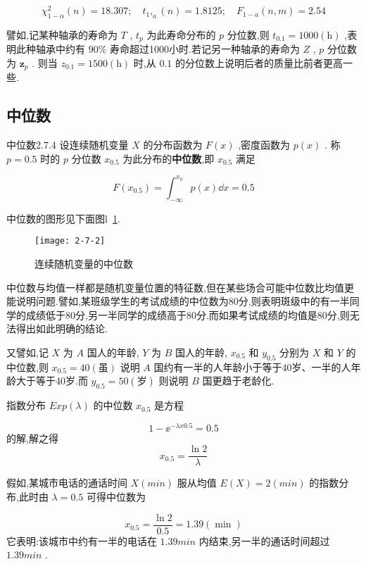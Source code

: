 \[
\chi_{1-\alpha}^{2}(n)=18.307 ; \quad t_{1},_{a}(n)=1.8125 ; \quad F_{1-a}(n, m)=2.54
\]

譬如,记某种轴承的寿命为 $ T $ , $ t_{p} $ 为此寿命分布的 $ p $ 分位数,则 $ t_{0.1}=1000 (\mathrm{h}) $ ,表明此种轴承中约有 $ 90\% $ 寿命超过1000小时.若记另一种轴承的寿命为 $ Z $ , $ p $ 分位数为 $ \boldsymbol{z}_{p} $ . 则当 $ z_{0.1}=1500(\mathrm{h}) $ 时,从 $ 0.1 $ 的分位数上说明后者的质量比前者更高一些.

\subsection{中位数}\label{ssec:2.7.4}

\begin{definition}{中位数}{2.7.4}
	设连续随机变量 $ X $ 的分布函数为 $ F(x) $ ,密度函数为 $ p(x) $ .
	称 $ p=0.5 $ 时的 $ p $ 分位数 $ x_{0.5} $ 为此分布的\textbf{中位数},即 $ x_{0.5} $ 满足
	
	\begin{equation}
	F\left(x_{0.5}\right)=\int_{-\infty}^{x_{0}} p(x) \dd x=0.5 \label{eq:2.7.8}
	\end{equation}
	
\end{definition}

中位数的图形见下面图l~\ref{fig:2.7.2}.

\begin{figure}
	\centering
	\texttt{[image: 2-7-2]}
	\caption{连续随机变量的中位数}
	\label{fig:2.7.2}
\end{figure}

中位数与均值一样都是随机变量位置的特征数,但在某些场合可能中位数比均值更能说明问题.譬如,某班级学生的考试成绩的中位数为80分,则表明斑级中的有一半同学的成绩低于80分,另一半同学的成绩高于80分.而如果考试成绩的均值是80分,则无法得出如此明确的结论.

又譬如,记 $ X $ 为 $ A $ 国人的年龄, $ Y $ 为 $ B $ 国人的年龄, $ x_{0.5} $ 和 $ y_{0.5} $ 分别为 $ X $ 和 $ Y $ 的中位数,则 $ x_{0.5}=40(\text{虽}) $ 说明 $ A $ 国约有一半的人年龄小于等于40岁、一半的人年龄大于等于40岁.而 $ y_{0.5}=50(\text{岁}) $ 则说明 $ B $ 国更趋于老龄化.

\begin{example}\label{exam:2.7.4}
	指数分布 $ E x p(\lambda) $ 的中位数 $ x_{0.5} $ 是方程
	
	\[
	1-\ee ^{-\lambda x 0.5}=0.5
	\]
	的解,解之得
	\[
	x_{0.5}=\frac{\ln 2}{\lambda}
	\]
	
	假如,某城市电话的通话时间 $ X(min) $ 服从均值 $ E(X)=2(min) $ 的指数分布,此时由 $ \lambda=0.5 $ 可得中位数为
	
	\[
	x_{0.5}=\frac{\ln 2}{0.5}=1.39(\min )
	\]
	它表明:该城市中约有一半的电话在 $ 1.39min $ 内结束,另一半的通话时间超过 $ 1.39 min $ .
\end{example}

